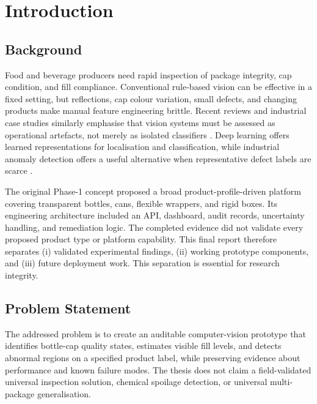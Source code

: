 \documentclass[12pt,a4paper]{report}
\begin{document}
\chapter{Introduction}
\section{Background}
Food and beverage producers need rapid inspection of package integrity, cap condition, and fill compliance. Conventional rule-based vision can be effective in a fixed setting, but reflections, cap colour variation, small defects, and changing products make manual feature engineering brittle. Recent reviews and industrial case studies similarly emphasise that vision systems must be assessed as operational artefacts, not merely as isolated classifiers \cite{liakos2025,xiong2024,ribeiro2025}. Deep learning offers learned representations for localisation and classification, while industrial anomaly detection offers a useful alternative when representative defect labels are scarce \cite{banus2021,liu2025,bergmann2019,roth2022,truong2024}.

The original Phase-1 concept proposed a broad product-profile-driven platform covering transparent bottles, cans, flexible wrappers, and rigid boxes. Its engineering architecture included an API, dashboard, audit records, uncertainty handling, and remediation logic. The completed evidence did not validate every proposed product type or platform capability. This final report therefore separates (i) validated experimental findings, (ii) working prototype components, and (iii) future deployment work. This separation is essential for research integrity.

\section{Problem Statement}
The addressed problem is to create an auditable computer-vision prototype that identifies bottle-cap quality states, estimates visible fill levels, and detects abnormal regions on a specified product label, while preserving evidence about performance and known failure modes. The thesis does not claim a field-validated universal inspection solution, chemical spoilage detection, or universal multi-package generalisation.
\end{document}
